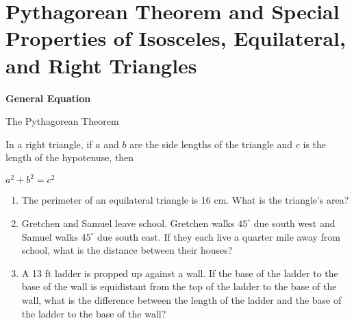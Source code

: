 \section[Special Triangles]{\sloppy Pythagorean Theorem and Special Properties of Isosceles, Equilateral, and Right Triangles}

\textbf{General Equation}

\bigskip
\begin{equationbox}{The Pythagorean Theorem}
\begin{center}
In a right triangle, if $a$ and $b$ are the side lengths of the triangle and $c$ is the length of the hypotenuse, then

\bigskip
$a^2+b^2=c^2$
\end{center}
\end{equationbox}

\bigskip
\begin{enumerate}[labelindent=*,style=multiline,leftmargin=*,label=\textbf{Example \arabic*:}]
\item The perimeter of an equilateral triangle is 16 cm. What is the triangle's area?

\vfill\item Gretchen and Samuel leave school. Gretchen walks $45^\circ$ due south west and Samuel walks $45^\circ$ due south east. If they each live a quarter mile away from school, what is the distance between their houses?

\vfill\item A 13 ft ladder is propped up against a wall. If the base of the ladder to the base of the wall is equidistant from the top of the ladder to the base of the wall, what is the difference between the length of the ladder and the base of the ladder to the base of the wall?
\end{enumerate}

